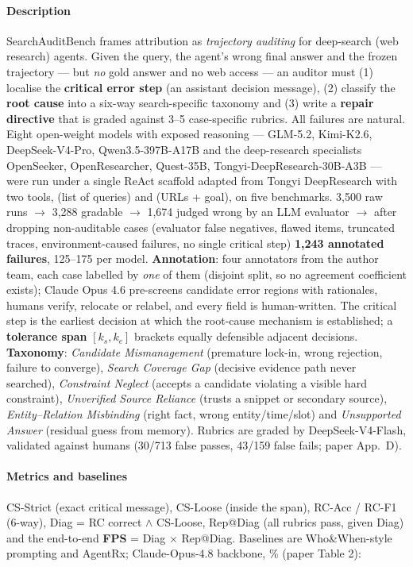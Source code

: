 \paragraph{Description} SearchAuditBench frames attribution as \emph{trajectory auditing} for deep-search (web research) agents. Given the query, the agent's wrong final answer and the frozen trajectory --- but \emph{no} gold answer and no web access --- an auditor must (1) localise the \textbf{critical error step} (an assistant decision message), (2) classify the \textbf{root cause} into a six-way search-specific taxonomy and (3) write a \textbf{repair directive} that is graded against 3--5 case-specific rubrics. All failures are natural. Eight open-weight models with exposed reasoning --- GLM-5.2, Kimi-K2.6, DeepSeek-V4-Pro, Qwen3.5-397B-A17B and the deep-research specialists OpenSeeker, OpenResearcher, Quest-35B, Tongyi-DeepResearch-30B-A3B --- were run under a single ReAct scaffold adapted from Tongyi DeepResearch with two tools,  (list of queries) and  (URLs + goal), on five benchmarks. 3,500 raw runs $\to$ 3,288 gradable $\to$ 1,674 judged wrong by an LLM evaluator $\to$ after dropping non-auditable cases (evaluator false negatives, flawed items, truncated traces, environment-caused failures, no single critical step) \textbf{1,243 annotated failures}, 125--175 per model. \textbf{Annotation}: four annotators from the author team, each case labelled by \emph{one} of them (disjoint split, so no agreement coefficient exists); Claude Opus 4.6 pre-screens candidate error regions with rationales, humans verify, relocate or relabel, and every field is human-written. The critical step is the earliest decision at which the root-cause mechanism is established; a \textbf{tolerance span} $[k_s,k_e]$ brackets equally defensible adjacent decisions. \textbf{Taxonomy}: \emph{Candidate Mismanagement} (premature lock-in, wrong rejection, failure to converge), \emph{Search Coverage Gap} (decisive evidence path never searched), \emph{Constraint Neglect} (accepts a candidate violating a visible hard constraint), \emph{Unverified Source Reliance} (trusts a snippet or secondary source), \emph{Entity--Relation Misbinding} (right fact, wrong entity/time/slot) and \emph{Unsupported Answer} (residual guess from memory). Rubrics are graded by DeepSeek-V4-Flash, validated against humans (30/713 false passes, 43/159 false fails; paper App.~D).

\paragraph{Metrics and baselines} CS-Strict (exact critical message), CS-Loose (inside the span), RC-Acc / RC-F1 (6-way), Diag = RC correct $\wedge$ CS-Loose, Rep@Diag (all rubrics pass, given Diag) and the end-to-end \textbf{FPS} = Diag $\times$ Rep@Diag. Baselines are Who\&When-style prompting and AgentRx; Claude-Opus-4.8 backbone, \% (paper Table 2):

